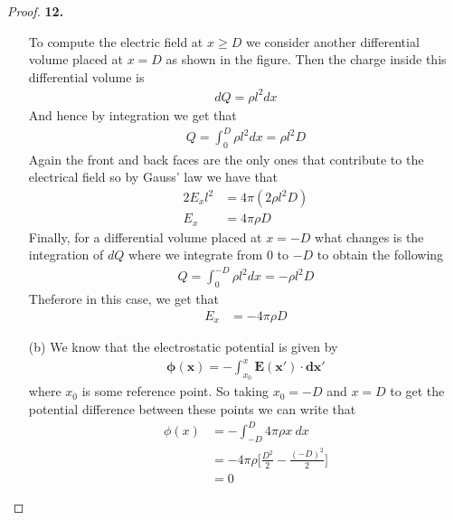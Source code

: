 \documentclass[11pt]{article}
\theoremstyle{definition}
\begin{document}
\begin{proof}{\textbf{12.}}
\begin{itemize}
        To compute the electric field at $x \geq D$ we consider another
        differential volume placed at $x = D$ as shown in the figure. Then
        the charge inside this differential volume is
        \begin{align*}
            dQ = \rho l^2 dx
        \end{align*}
        And hence by integration we get that
        \begin{align*}
            Q = \int_0^D \rho l^2 dx = \rho l^2 D
        \end{align*}
        Again the front and back faces are the only ones that contribute to
        the electrical field so by Gauss' law we have that
        \begin{align*}
            2E_x l^2 &= 4\pi(2\rho l^2 D)\\
            E_x &= 4\pi \rho D
        \end{align*}
        Finally, for a differential volume placed at $x=-D$ what changes is
        the integration of $dQ$ where we integrate from $0$ to $-D$ to obtain
        the following
        \begin{align*}
            Q = \int_0^{-D} \rho l^2 dx = -\rho l^2 D
        \end{align*}
        Theferore in this case, we get that 
        \begin{align*}
            E_x &= -4\pi \rho D
        \end{align*}

        \item [(b)] We know that the electrostatic potential is given by
        \begin{align*}
            \bm{\phi(x)} = - \int_{x_0}^x \bm{E(x') \cdot dx'}
        \end{align*}
        where $x_0$ is some reference point. So taking $x_0 = -D$ and $x = D$
        to get the potential difference between these points we can write that
        \begin{align*}
            \phi(x) &= - \int_{-D}^D 4\pi\rho x~dx \\
            &= -4\pi\rho \bigg[\frac{D^2}{2} - \frac{(-D)^2}{2}\bigg]\\
            &= 0
        \end{align*}
    \end{itemize}
\end{proof}
\cleardoublepage
\end{document}

